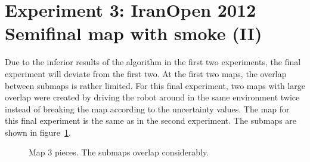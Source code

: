 \section{Experiment 3: IranOpen 2012 Semifinal map with smoke (II)}

Due to the inferior results of the algorithm in the first two experiments, the final experiment will deviate from the first two. At the first two maps, the overlap between submaps is rather limited. For this final experiment, two maps with large overlap were created by driving the robot around in the same environment twice instead of breaking the map according to the uncertainty values. The map for this final experiment is the same as in the second experiment. The submaps are shown in figure~\ref{fig:map4-parts}. 

\begin{figure}[ht]
  \centering
  \caption{Map 3 pieces. The submaps overlap considerably. }
  \label{fig:map4-parts}
\end{figure}

